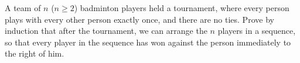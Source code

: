 
A team of $n$ ($n \geq 2$) badminton players held a tournament, where every person plays with every other person exactly once, and there are no ties. Prove by induction that after the tournament, we can arrange the $n$ players in a sequence, so that every player in the sequence has won against the person immediately to the right of him.


